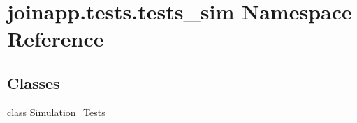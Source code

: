 \hypertarget{namespacejoinapp_1_1tests_1_1tests__sim}{}\section{joinapp.\+tests.\+tests\+\_\+sim Namespace Reference}
\label{namespacejoinapp_1_1tests_1_1tests__sim}
\subsection*{Classes}
\begin{DoxyCompactItemize}
\item 
class \mbox{\hyperlink{classjoinapp_1_1tests_1_1tests__sim_1_1_simulation___tests}{Simulation\+\_\+\+Tests}}
\end{DoxyCompactItemize}
